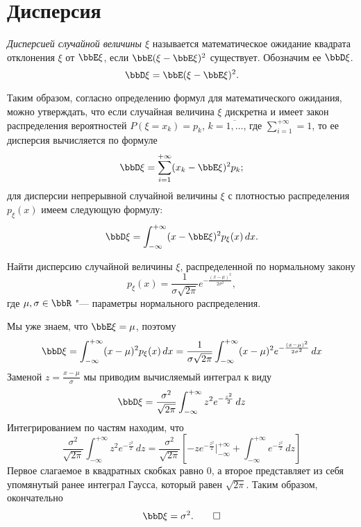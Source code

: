 \section{Дисперсия}
\begin{defn}
\textit{Дисперсией случайной величины $\xi$} называется математическое ожидание квадрата отклонения $\xi$ от $\bbE\xi$, если $\bbE(\xi-\bbE\xi)^2$ существует. Обозначим ее $\bbD\xi$. 
\begin{equation} \label{ch31.4eq1}
\bbD\xi=\bbE(\xi-\bbE\xi)^2.
\end{equation}
\end{defn}

Таким образом, согласно определению формул для  математического ожидания, можно утверждать, что если случайная величина $\xi$ дискретна и имеет закон распределения вероятностей $P(\xi = x_k) = p_k$, $k=\overline{1,\dots}$, где $\sum_{i=1}^{+\infty} = 1$, то ее дисперсия вычисляется по формуле 
\begin{equation}
\bbD\xi = \sum_{i=1}^{+\infty} (x_k - \bbE\xi)^2 p_k;
\end{equation}
для дисперсии непрерывной случайной величины $\xi$ с плотностью распределения $p_{\xi}(x)$ имеем следующую формулу:
\begin{equation}
\bbD\xi = \int_{-\infty}^{+\infty} (x - \bbE\xi)^2 p_{\xi}(x)\,dx.
\end{equation}

\begin{exmpl}
Найти дисперсию случайной величины $\xi$, распределенной по нормальному закону
$$
p_{\xi}(x) = \frac{1}{\sigma \sqrt{2\pi}}e^{-\frac{(x-\mu)^2}{2\sigma^2}},
$$
где $\mu,\sigma\in\bbR$ "--- параметры нормального распределения. 
\end{exmpl}
\begin{solution}
Мы уже знаем, что $\bbE\xi = \mu$, поэтому
$$
\bbD\xi = \int_{-\infty}^{+\infty} (x - \mu)^2 p_{\xi}(x) \,dx = \frac{1}{\sigma \sqrt{2\pi}}\int_{-\infty}^{+\infty} (x - \mu)^2 e^{-\frac{(x-\mu)^2}{2\sigma^2}} \,dx
$$
Заменой $z = \frac{x-\mu}{\sigma}$ мы приводим вычисляемый интеграл к виду
$$
\bbD\xi = \frac{\sigma^2}{ \sqrt{2\pi}}\int_{-\infty}^{+\infty} z^2 e^{-\frac{z^2}{2}} \,dz
$$
Интегрированием по частям находим, что 
$$
\frac{\sigma^2}{ \sqrt{2\pi}}\int_{-\infty}^{+\infty} z^2 e^{-\frac{z^2}{2}} \,dz = \frac{\sigma^2}{ \sqrt{2\pi}}\left[-z e^{-\frac{z^2}{2}} \bigg|_{-\infty}^{+\infty} + \int_{-\infty}^{+\infty} e^{-\frac{z^2}{2}}\,dz\right]
$$
Первое слагаемое в квадратных скобках равно $0$, а второе представляет из себя упомянутый ранее интеграл Гаусса, который равен $\sqrt{2\pi}$. Таким образом, окончательно
\begin{equation*}
\bbD\xi = \sigma^2.\qedhere
\end{equation*}
\end{solution}

